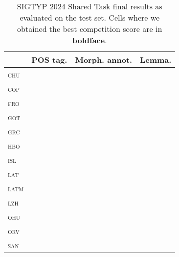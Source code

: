 \documentclass{../acl_latex.tex}
\begin{document}
\begin{table}[t]
\centering
\begin{tabular}{lrrr}
\toprule
                 & POS tag. & Morph. annot. & Lemma. \\ \midrule
\textsc{chu}     &          &               &        \\ 
\textsc{cop}     &          &               &        \\ 
\textsc{fro}     &          &               &        \\
\textsc{got}     &          &               &        \\
\textsc{grc}     &          &               &        \\
\textsc{hbo}     &          &               &        \\
\textsc{isl}     &          &               &        \\
\textsc{lat}     &          &               &        \\
\textsc{latm}    &          &               &        \\
\textsc{lzh}     &          &               &        \\
\textsc{ohu}     &          &               &        \\
\textsc{orv}     &          &               &        \\
\textsc{san}     &          &               &        \\ \bottomrule 
\end{tabular}
\caption{
    SIGTYP 2024 Shared Task final results as evaluated on the test set.
    Cells where we obtained the best competition score are in \textbf{boldface}.
}
\label{table:main_results}
\end{table}
\end{document}
